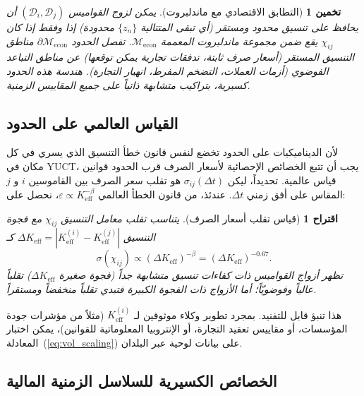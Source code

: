 \documentclass[12pt,a4paper]{article}
\newtheorem{proposition}[theorem]{اقتراح}
\newtheorem{conjecture}[theorem]{تخمين}
\theoremstyle{remark}
\begin{document}
	\begin{conjecture}[التطابق الاقتصادي مع ماندلبروت]
		يمكن لزوج القواميس \((\mathcal{D}_i, \mathcal{D}_j)\) أن يحافظ على تنسيق محدود ومستقر (أي تبقى المتتالية \(\{z_n\}\) محدودة) إذا وفقط إذا كان \(\chi_{ij}\) يقع ضمن مجموعة ماندلبروت المعممة \(\mathcal{M}_{\mathrm{econ}}\). تفصل الحدود \(\partial\mathcal{M}_{\mathrm{econ}}\) مناطق التنسيق المستقر (أسعار صرف ثابتة، تدفقات تجارية يمكن توقعها) عن مناطق التباعد الفوضوي (أزمات العملات، التضخم المفرط، انهيار التجارة). هندسة هذه الحدود كسيرية، بتراكيب متشابهة ذاتياً على جميع المقاييس الزمنية.
	\end{conjecture}
	
	\subsection{القياس العالمي على الحدود}
	
	لأن الديناميكيات على الحدود تخضع لنفس قانون خطأ التنسيق الذي يسري في كل مكان في YUCT، يجب أن تتبع الخصائص الإحصائية لأسعار الصرف قرب الحدود قوانين قياس عالمية. تحديداً، ليكن \(\sigma_{ij}(\Delta t)\) هو تقلب سعر الصرف بين القاموسين \(i\) و \(j\) المقاس على أفق زمني \(\Delta t\). عندئذ، من قانون الخطأ العالمي \(\varepsilon \propto K_{\mathrm{eff}}^{-\beta}\)، نحصل على:
	
	\begin{proposition}[قياس تقلب أسعار الصرف]
		يتناسب تقلب معامل التنسيق \(\chi_{ij}\) مع فجوة التنسيق \(\Delta K_{\mathrm{eff}} = |K_{\mathrm{eff}}^{(i)} - K_{\mathrm{eff}}^{(j)}|\) كـ
		\begin{equation}
			\sigma(\chi_{ij}) \propto (\Delta K_{\mathrm{eff}})^{-\beta} = (\Delta K_{\mathrm{eff}})^{-0.67}.
			\label{eq:vol_scaling}
		\end{equation}
		تظهر أزواج القواميس ذات كفاءات تنسيق متشابهة جداً (فجوة صغيرة \(\Delta K_{\mathrm{eff}}\)) تقلباً عالياً وفوضويّاً؛ أما الأزواج ذات الفجوة الكبيرة فتبدي تقلباً منخفضاً ومستقراً.
	\end{proposition}
	
	هذا تنبؤ قابل للتفنيد. بمجرد تطوير وكلاء موثوقين لـ \(K_{\mathrm{eff}}^{(i)}\) (مثلاً من مؤشرات جودة المؤسسات، أو مقاييس تعقيد التجارة، أو الإنتروبيا المعلوماتية للقوانين)، يمكن اختبار المعادلة~(\ref{eq:vol_scaling}) على بيانات لوحية عبر البلدان.
	
	\subsection{الخصائص الكسيرية للسلاسل الزمنية المالية}
	
\end{document}
